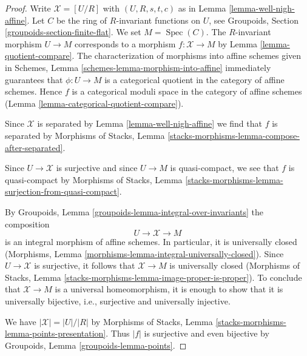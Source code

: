 \documentclass{stacks-project}
\theoremstyle{plain}
\theoremstyle{definition}
\theoremstyle{remark}
\numberwithin{equation}{subsection}
\def\Spec{\mathop{\mathrm{Spec}}}
\begin{document}
\begin{proof}
Write $\mathcal{X} = [U/R]$ with $(U, R, s, t, c)$ as in
Lemma \ref{lemma-well-nigh-affine}. Let $C$ be the ring of
$R$-invariant functions on $U$, see
Groupoids, Section \ref{groupoids-section-finite-flat}.
We set $M = \Spec(C)$. The $R$-invariant morphism
$U \to M$ corresponds to a morphism $f : \mathcal{X} \to M$ by
Lemma \ref{lemma-quotient-compare}.
The characterization of morphisms into affine schemes given in
Schemes, Lemma \ref{schemes-lemma-morphism-into-affine}
immediately guarantees that $\phi : U \to M$ is a categorical
quotient in the category of affine schemes. Hence $f$ is a
categorical moduli space in the category of affine schemes
(Lemma \ref{lemma-categorical-quotient-compare}).

\medskip\noindent
Since $\mathcal{X}$ is separated by Lemma \ref{lemma-well-nigh-affine}
we find that $f$ is separated by Morphisms of Stacks, Lemma
\ref{stacks-morphisms-lemma-compose-after-separated}.

\medskip\noindent
Since $U \to \mathcal{X}$ is surjective and since $U \to M$ is quasi-compact,
we see that $f$ is quasi-compact by Morphisms of Stacks, Lemma
\ref{stacks-morphisms-lemma-surjection-from-quasi-compact}.

\medskip\noindent
By Groupoids, Lemma \ref{groupoids-lemma-integral-over-invariants}
the composition
$$
U \to \mathcal{X} \to M
$$
is an integral morphism of affine schemes. In particular, it is
universally closed
(Morphisms, Lemma \ref{morphisms-lemma-integral-universally-closed}).
Since $U \to \mathcal{X}$ is surjective, it follows that $\mathcal{X} \to M$
is universally closed (Morphisms of Stacks, Lemma
\ref{stacks-morphisms-lemma-image-proper-is-proper}).
To conclude that $\mathcal{X} \to M$ is a universal homeomorphism,
it is enough to show that it is universally bijective, i.e.,
surjective and universally injective.

\medskip\noindent
We have $|\mathcal{X}| = |U|/|R|$ by
Morphisms of Stacks, Lemma \ref{stacks-morphisms-lemma-points-presentation}.
Thus $|f|$ is surjective and even bijective
by Groupoids, Lemma \ref{groupoids-lemma-points}.


\end{proof}
\end{document}

